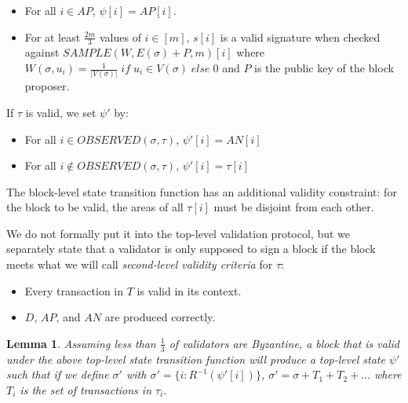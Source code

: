 \documentclass[11pt,a4paper]{report}
\theoremstyle{plain}
\newtheorem{lem}[thm]{Lemma}
\theoremstyle{definition}
\theoremstyle{remark}
\begin{document}
\begin{itemize}
\item
For all $i \in AP$, $\psi[i] = AP[i]$.
\item
For at least $\frac{2m}{3}$ values of $i \in [m]$, $s[i]$ is a valid signature when checked against $SAMPLE(W, E(\sigma) + P, m)[i]$ where $W(\sigma, u_i) = \frac{1}{|V(\sigma)|} \; if \; u_i \in V(\sigma) \; else \; 0$ and $P$ is the public key of the block proposer.
\end{itemize}

If $\tau$ is valid, we set $\psi'$ by:

\begin{itemize}
\item
For all $i \in OBSERVED(\sigma, \tau)$, $\psi'[i] = AN[i]$
\item
For all $i \notin OBSERVED(\sigma, \tau)$, $\psi'[i] = \tau[i]$
\end{itemize}

The block-level state transition function has an additional validity constraint: for the block to be valid, the areas of all $\tau[i]$ must be disjoint from each other.

We do not formally put it into the top-level validation protocol, but we separately state that a validator is only supposed to sign a block if the block meets what we will call \emph{second-level validity criteria} for $\tau$:

\begin{itemize}
\item
Every transaction in $T$ is valid in its context.
\item
$D$, $AP$, and $AN$ are produced correctly.
\end{itemize}

\begin{lem}
Assuming less than $\frac{1}{3}$ of validators are Byzantine, a block that is valid under the above top-level state transition function will produce a top-level state $\psi'$ such that if we define $\sigma'$ with $\sigma' = \{i: R^{-1}(\psi'[i])\}$, $\sigma' = \sigma + T_1 + T_2 + ...$ where $T_i$ is the set of transactions in $\tau_i$.
\end{lem}
\end{document}
